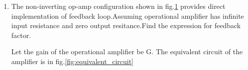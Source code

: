 \begin{enumerate}[label=\thesubsection.\arabic*.,ref=\thesubsection.\theenumi]

\item
The non-inverting op-amp configuration shown in fig.\ref{fig:original_circuit} provides direct implementation of feedback loop.Assuming operational amplifier has infinite input resistance and zero output resitance.Find the expression for feedback factor.
\begin{figure}[!ht]
	\begin{center}
		
		\resizebox{\columnwidth}{!}{}
	\end{center}
\caption{}
\label{fig:original_circuit}
\end{figure}
\solution Let the gain of the operational amplifier be G.
The equivalent circuit of the amplifier is in fig.\ref{fig:equivalent_circuit}
\begin{figure}[!ht]
	\begin{center}
		

\end{center}
\end{figure}
\end{enumerate}
